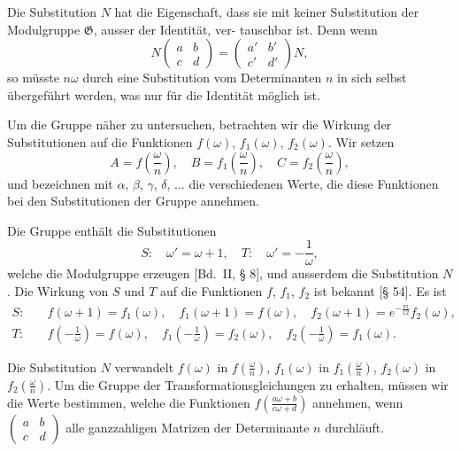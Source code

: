 \documentclass[12pt,a4paper]{article}
\theoremstyle{definition}
\begin{document}
Die Substitution $N$ hat die Eigenschaft, dass sie mit keiner
Substitution der Modulgruppe $\mathfrak{G}$, ausser der Identit\"at, ver-
tauschbar ist. Denn wenn
\begin{equation*}
N \begin{pmatrix} a & b \\ c & d \end{pmatrix} = \begin{pmatrix} a' & b' \\ c' & d' \end{pmatrix} N,
\end{equation*}
so m\"usste $n\omega$ durch eine Substitution vom Determinanten $n$
in sich selbst \"ubergef\"uhrt werden, was nur f\"ur die Identit\"at
m\"oglich ist.

Um die Gruppe n\"aher zu untersuchen, betrachten wir die
Wirkung der Substitutionen auf die Funktionen $f(\omega)$, $f_1(\omega)$,
$f_2(\omega)$. Wir setzen
\begin{equation}\tag{4}
A = f\left(\frac{\omega}{n}\right), \quad B = f_1\left(\frac{\omega}{n}\right), \quad C = f_2\left(\frac{\omega}{n}\right),
\end{equation}
und bezeichnen mit $\alpha$, $\beta$, $\gamma$, $\delta$, $\ldots$ die verschiedenen
Werte, die diese Funktionen bei den Substitutionen der Gruppe
annehmen.

Die Gruppe enth\"alt die Substitutionen
\begin{equation}\tag{5}
S: \quad \omega' = \omega + 1, \quad T: \quad \omega' = -\frac{1}{\omega},
\end{equation}
welche die Modulgruppe erzeugen [Bd.~II, \S{} 8], und ausserdem
die Substitution $N$. Die Wirkung von $S$ und $T$ auf die
Funktionen $f$, $f_1$, $f_2$ ist bekannt [\S{} 54]. Es ist
\begin{equation}\tag{6}
\begin{aligned}
S: &\quad f(\omega+1) = f_1(\omega), \quad f_1(\omega+1) = f(\omega), \quad f_2(\omega+1) = e^{-\frac{\pi i}{12}} f_2(\omega), \\
T: &\quad f(-\tfrac{1}{\omega}) = f(\omega), \quad f_1(-\tfrac{1}{\omega}) = f_2(\omega), \quad f_2(-\tfrac{1}{\omega}) = f_1(\omega).
\end{aligned}
\end{equation}

Die Substitution $N$ verwandelt $f(\omega)$ in $f(\frac{\omega}{n})$,
$f_1(\omega)$ in $f_1(\frac{\omega}{n})$, $f_2(\omega)$ in $f_2(\frac{\omega}{n})$.
Um die Gruppe der Transformationsgleichungen zu erhalten,
m\"ussen wir die Werte bestimmen, welche die Funktionen
$f(\frac{a\omega+b}{c\omega+d})$ annehmen, wenn $\begin{pmatrix} a & b \\ c & d \end{pmatrix}$ alle
ganzzahligen Matrizen der Determinante $n$ durchl\"auft.
\end{document}
